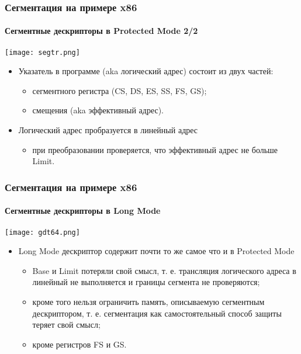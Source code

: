 \begin{frame}
\frametitle{Сегментация на примере x86}
\framesubtitle{Сегментные дескрипторы в Protected Mode 2/2}
\begin{center}
  \texttt{[image: segtr.png]}
\end{center}
\begin{itemize}
  \item Указатель в программе (aka логический адрес) состоит из двух частей:
  \begin{itemize}
    \item сегментного регистра (CS, DS, ES, SS, FS, GS);
    \item смещения (aka эффективный адрес).
  \end{itemize}
  \item Логический адрес пробразуется в линейный адрес
  \begin{itemize}
    \item при преобразовании проверяется, что эффективный адрес не больше Limit.
  \end{itemize}
\end{itemize}
\end{frame}

\begin{frame}
\frametitle{Сегментация на примере x86}
\framesubtitle{Сегментные дескрипторы в Long Mode}
\begin{center}
  \texttt{[image: gdt64.png]}
\end{center}
\begin{itemize}
  \item Long Mode дескриптор содержит почти то же самое что и в Protected Mode
  \begin{itemize}
    \item Base и Limit потеряли свой смысл, т. е. трансляция логического адреса
    в линейный не выполняется и границы сегмента не проверяются;
    \item кроме того нельзя ограничить память, описываемую сегментным
    дескриптором, т. е. сегментация как самостоятельный способ защиты теряет
    свой смысл;
    \item кроме регистров FS и GS.
  \end{itemize}
\end{itemize}
\end{frame}

